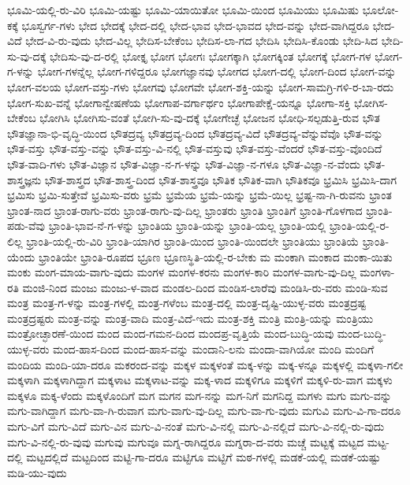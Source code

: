 {ಭೂಮಿ-ಯಲ್ಲಿ-ರು-ವಿರಿ
ಭೂಮಿ-ಯಷ್ಟು
ಭೂಮಿ-ಯಾಯಿತೋ
ಭೂಮಿ-ಯಿಂದ
ಭೂಮಿಯು
ಭೂಮಿಷು
ಭೂಲೋ-ಕಕ್ಕೆ
ಭೂಸ್ವರ್ಗ-ಗಳು
ಭೇದ
ಭೇದಕ್ಕೆ
ಭೇದ-ದಲ್ಲಿ
ಭೇದ-ಭಾವ
ಭೇದ-ಭಾವದ
ಭೇದ-ವನ್ನು
ಭೇದ-ವಾಗಿದ್ದರೂ
ಭೇದ-ವಿದೆ
ಭೇದ-ವಿ-ರು-ವುದು
ಭೇದ-ವಿಲ್ಲ
ಭೇದಿಸ-ಬೇಕೆಂಬ
ಭೇದಿಸ-ಲಾ-ಗದ
ಭೇದಿಸಿ
ಭೇದಿಸಿ-ಕೊಂಡು
ಭೇದಿ-ಸಿದ
ಭೇದಿ-ಸು-ವು-ದಕ್ಕೆ
ಭೇದಿಸು-ವು-ದ-ರಲ್ಲಿ
ಭೋಕ್ತೃ
ಭೋಗ
ಭೋಗಃ
ಭೋಗಕ್ಕಾಗಿ
ಭೋಗಕ್ಕಿಂತ
ಭೋಗಕ್ಕೆ
ಭೋಗ-ಗಳ
ಭೋಗ-ಗ-ಳನ್ನು
ಭೋಗ-ಗಳನ್ನೆಲ್ಲ
ಭೋಗ-ಗಳಿದ್ದರೂ
ಭೋಗಜ್ಞಾನವು
ಭೋಗದ
ಭೋಗ-ದಲ್ಲಿ
ಭೋಗ-ದಿಂದ
ಭೋಗ-ವನ್ನು
ಭೋಗ-ವಲಯ
ಭೋಗ-ವಸ್ತು-ಗಳು
ಭೋಗವು
ಭೋಗವೇ
ಭೋಗ-ಶಕ್ತಿ-ಯನ್ನು
ಭೋಗ-ಸಾಮಗ್ರಿ-ಗಳಿ-ರ-ಬಾ-ರದು
ಭೋಗ-ಸುಖ-ವನ್ನೆ
ಭೋಗಾನ್ವೇಷಣೆಯ
ಭೋಗಾಪ-ವರ್ಗಾರ್ಥಂ
ಭೋಗಾಪೇಕ್ಷೆ-ಯನ್ನೂ
ಭೋಗಾ-ಸಕ್ತಿ
ಭೋಗಿಸ-ಬೇಕೆಂಬ
ಭೋಗಿಸಿ
ಭೋಗಿಸು-ವಂತೆ
ಭೋಗಿ-ಸು-ವು-ದಕ್ಕೆ
ಭೋಗೇಚ್ಛೆ
ಭೋಜನ
ಭೋಧಿ-ಸಲ್ಪಡುತ್ತಿ-ರುವ
ಭೌತ
ಭೌತಜ್ಞಾನಾ-ಭಿ-ವೃದ್ಧಿ-ಯಿಂದ
ಭೌತದ್ರವ್ಯ
ಭೌತದ್ರವ್ಯ-ದಿಂದ
ಭೌತದ್ರವ್ಯ-ವಿದೆ
ಭೌತದ್ರವ್ಯ-ವೆನ್ನುವೆವೊ
ಭೌತ-ವನ್ನು
ಭೌತ-ವಸ್ತು
ಭೌತ-ವಸ್ತು-ವನ್ನು
ಭೌತ-ವಸ್ತು-ವಿ-ನಲ್ಲಿ
ಭೌತ-ವಸ್ತುವು
ಭೌತ-ವಸ್ತು-ವೆಂದರೆ
ಭೌತ-ವಸ್ತು-ವೊಂದಿದೆ
ಭೌತ-ವಾದಿ-ಗಳು
ಭೌತ-ವಿಜ್ಞಾನ
ಭೌತ-ವಿಜ್ಞಾ-ನ-ಗ-ಳನ್ನು
ಭೌತ-ವಿಜ್ಞಾ-ನ-ಗಳೂ
ಭೌತ-ವಿಜ್ಞಾ-ನ-ವೆಂದು
ಭೌತ-ಶಾಸ್ತ್ರಜ್ಞನು
ಭೌತ-ಶಾಸ್ತ್ರದ
ಭೌತ-ಶಾಸ್ತ್ರ-ದಿಂದ
ಭೌತ-ಶಾಸ್ತ್ರವೂ
ಭೌತಿಕ
ಭೌತಿಕ-ವಾಗಿ
ಭೌತಿಕವೂ
ಭ್ರಮಿಸಿ
ಭ್ರಮಿಸಿ-ದಾಗ
ಭ್ರಮಿಸು
ಭ್ರಮಿ-ಸುತ್ತೇವೆ
ಭ್ರಮಿಸು-ವರು
ಭ್ರಮೆ
ಭ್ರಮೆಯ
ಭ್ರಮೆ-ಯನ್ನು
ಭ್ರಮೆ-ಯಿಲ್ಲ
ಭ್ರಷ್ಟ-ನಾ-ಗಿ-ರುವನು
ಭ್ರಾಂತ
ಭ್ರಾಂತ-ನಾದ
ಭ್ರಾಂತ-ರಾಗು-ವರು
ಭ್ರಾಂತ-ರಾಗು-ವು-ದಿಲ್ಲ
ಭ್ರಾಂತರು
ಭ್ರಾಂತಿ
ಭ್ರಾಂತಿಗೆ
ಭ್ರಾಂತಿ-ಗೊಳಗಾದ
ಭ್ರಾಂತಿ-ಪಡು-ವೆವು
ಭ್ರಾಂತಿ-ಭಾವ-ನೆ-ಗ-ಳನ್ನು
ಭ್ರಾಂತಿಯ
ಭ್ರಾಂತಿ-ಯನ್ನು
ಭ್ರಾಂತಿ-ಯಲ್ಲ
ಭ್ರಾಂತಿ-ಯಲ್ಲಿ
ಭ್ರಾಂತಿ-ಯಲ್ಲಿ-ರ-ಲಿಲ್ಲ
ಭ್ರಾಂತಿ-ಯಲ್ಲಿ-ರು-ವಿರಿ
ಭ್ರಾಂತಿ-ಯಾಗಿರ
ಭ್ರಾಂತಿ-ಯಿಂದ
ಭ್ರಾಂತಿ-ಯಿಂದಲೇ
ಭ್ರಾಂತಿಯು
ಭ್ರಾಂತಿಯೆ
ಭ್ರಾಂತಿ-ಯೆಂದು
ಭ್ರಾಂತಿಯೇ
ಭ್ರಾಂತಿ-ರೂಪದ
ಭ್ರೂಣ
ಭ್ರೂಣಸ್ಥಿತಿ-ಯಲ್ಲಿ-ರ-ಬೇಕು
ಮ
ಮಂಕಾಗಿ
ಮಂಕಾದ
ಮಂಕಾ-ಯಿತು
ಮಂಕು
ಮಂಗ-ಮಾಯ-ವಾಗು-ವುದು
ಮಂಗಳ
ಮಂಗಳ-ಕರನು
ಮಂಗಳ-ಕಾರಿ
ಮಂಗಳ-ವಾಗು-ವು-ದಿಲ್ಲ
ಮಂಗಳಾ-ರತಿ
ಮಂಜಿ-ನಿಂದ
ಮಂಜು
ಮಂಜು-ಳ-ವಾದ
ಮಂಡಲ-ದಿಂದ
ಮಂಡಿಸ-ಲಾರೆವು
ಮಂಡಿಸಿ-ರು-ವರು
ಮಂಡಿ-ಸುವ
ಮಂತ್ರ
ಮಂತ್ರ-ಗ-ಳನ್ನು
ಮಂತ್ರ-ಗಳಲ್ಲಿ
ಮಂತ್ರ-ಗಳೆಂಬ
ಮಂತ್ರ-ದಲ್ಲಿ
ಮಂತ್ರ-ದೃಷ್ಟಿ-ಯುಳ್ಳ-ವರು
ಮಂತ್ರದ್ರಷ್ಟ
ಮಂತ್ರದ್ರಷ್ಟರು
ಮಂತ್ರ-ವನ್ನು
ಮಂತ್ರ-ವಾದಿ
ಮಂತ್ರ-ವಿದೆ-ಇದು
ಮಂತ್ರ-ಶಕ್ತಿ
ಮಂತ್ರಿ
ಮಂತ್ರಿ-ಯನ್ನು
ಮಂತ್ರಿಯು
ಮಂತ್ರೋಚ್ಛಾರಣೆ-ಯಿಂದ
ಮಂದ
ಮಂದ-ಗಮನ-ದಿಂದ
ಮಂದಪ್ರ-ವೃತ್ತಿಯೆ
ಮಂದ-ಬುದ್ಧಿ-ಯವು
ಮಂದ-ಬುದ್ಧಿ-ಯುಳ್ಳ-ವರು
ಮಂದ-ಹಾಸ-ದಿಂದ
ಮಂದ-ಹಾಸ-ವನ್ನು
ಮಂದಾನಿ-ಲನು
ಮಂದಾ-ವಾಗಿಯೋ
ಮಂದಿ
ಮಂದಿಗೆ
ಮಂದಿಯ
ಮಂದಿ-ಯಾ-ದರೂ
ಮಕರಂದ-ವನ್ನು
ಮಕ್ಕಳ
ಮಕ್ಕಳಂತೆ
ಮಕ್ಕ-ಳನ್ನು
ಮಕ್ಕ-ಳನ್ನೂ
ಮಕ್ಕಳಲ್ಲಿ
ಮಕ್ಕಳಾ-ಗಲೀ
ಮಕ್ಕಳಾಗಿ
ಮಕ್ಕಳಾಗಿದ್ದಾಗ
ಮಕ್ಕಳಾಟ
ಮಕ್ಕಳಾಟ-ವನ್ನು
ಮಕ್ಕ-ಳಾದ
ಮಕ್ಕಳಿಗೂ
ಮಕ್ಕಳಿಗೆ
ಮಕ್ಕಳಿ-ರು-ವಾಗ
ಮಕ್ಕಳು
ಮಕ್ಕಳೂ
ಮಕ್ಕ-ಳೆಂದು
ಮಕ್ಕಳೊಂದಿಗೆ
ಮಗ
ಮಗನ
ಮಗ-ನನ್ನು
ಮಗ-ನಿಗೆ
ಮಗನಿದ್ದ
ಮಗಳು
ಮಗು
ಮಗು-ವನ್ನು
ಮಗು-ವಾಗಿದ್ದಾಗ
ಮಗು-ವಾ-ಗಿ-ರುವಾಗ
ಮಗು-ವಾಗು-ವು-ದಿಲ್ಲ
ಮಗು-ವಾ-ಗು-ವುದು
ಮಗುವಿ
ಮಗು-ವಿ-ಗಾ-ದರೂ
ಮಗು-ವಿಗೆ
ಮಗು-ವಿದೆ
ಮಗು-ವಿನ
ಮಗು-ವಿ-ನಂತೆ
ಮಗು-ವಿ-ನಲ್ಲಿ
ಮಗು-ವಿ-ನಲ್ಲಿದೆ
ಮಗು-ವಿ-ನಲ್ಲಿ-ರು-ವುದು
ಮಗು-ವಿ-ನಲ್ಲಿ-ರು-ವುವು
ಮಗುವು
ಮಗುವೂ
ಮಗ್ನ-ರಾಗಿದ್ದರೂ
ಮಗ್ನರಾ-ದ-ವರು
ಮಚ್ಚೆ
ಮಟ್ಟಕ್ಕೆ
ಮಟ್ಟದ
ಮಟ್ಟ-ದಲ್ಲಿ
ಮಟ್ಟದಲ್ಲಿದೆ
ಮಟ್ಟದಿಂದ
ಮಟ್ಟಿ-ಗಾ-ದರೂ
ಮಟ್ಟಿಗೂ
ಮಟ್ಟಿಗೆ
ಮಠ-ಗಳಲ್ಲಿ
ಮಡಕೆ-ಯಲ್ಲಿ
ಮಡಕೆ-ಯಷ್ಟು
ಮಡಿ-ಯು-ವುದು
}

